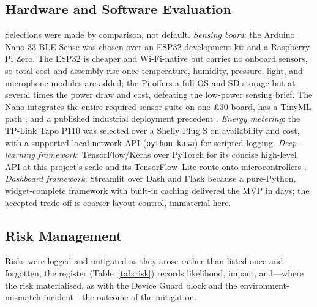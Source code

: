 \documentclass[11pt,a4paper]{article}
\begin{document}
\subsection{Hardware and Software Evaluation}
Selections were made by comparison, not default. \emph{Sensing board}: the
Arduino Nano 33 BLE Sense was chosen over an ESP32 development kit and a
Raspberry Pi Zero. The ESP32 is cheaper and Wi-Fi-native but carries no onboard
sensors, so total cost and assembly rise once temperature, humidity, pressure,
light, and microphone modules are added; the Pi offers a full OS and SD storage
but at several times the power draw and cost, defeating the low-power sensing
brief. The Nano integrates the entire required sensor suite on one \pounds30
board, has a TinyML path \cite{warden2019tinyml}, and a published industrial
deployment precedent \cite{baskar2024edge}. \emph{Energy metering}: the TP-Link
Tapo P110 was selected over a Shelly Plug S on availability and cost, with a
supported local-network API (\texttt{python-kasa}) for scripted logging.
\emph{Deep-learning framework}: TensorFlow/Keras over PyTorch for its concise
high-level API at this project's scale and its TensorFlow~Lite route onto
microcontrollers \cite{abadi2016tensorflow}. \emph{Dashboard framework}:
Streamlit over Dash and Flask because a pure-Python, widget-complete framework
with built-in caching delivered the MVP in days; the accepted trade-off is
coarser layout control, immaterial here.

\subsection{Risk Management}
Risks were logged and mitigated as they arose rather than listed once and
forgotten; the register (Table~\ref{tab:risk}) records likelihood, impact, and---where
the risk materialised, as with the Device Guard block and the
environment-mismatch incident---the outcome of the mitigation.
\end{document}
